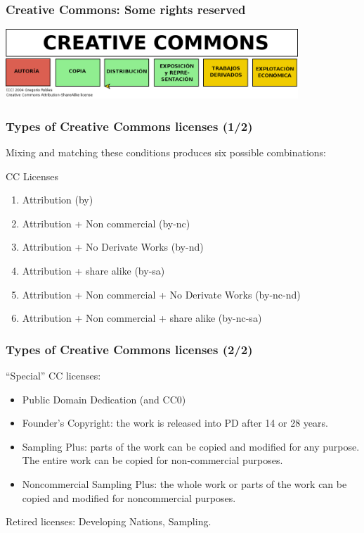 
\begin{frame}
\frametitle{Creative Commons: Some rights reserved}

\includegraphics[width=11cm]{figs/CreativeCommons.png}

\end{frame}


\begin{frame}
\frametitle{Types of Creative Commons licenses (1/2)}

Mixing and matching these conditions produces six possible combinations:

\begin{block}{CC Licenses}
\begin{enumerate}
\item Attribution (by)
\item Attribution + Non commercial (by-nc)
\item Attribution + No Derivate Works (by-nd)
\item Attribution + share alike (by-sa)
\item Attribution + Non commercial + No Derivate Works (by-nc-nd)
\item Attribution + Non commercial + share alike (by-nc-sa)
\end{enumerate}                                                 
\end{block}
\end{frame}


\begin{frame}
\frametitle{Types of Creative Commons licenses (2/2)}

``Special'' CC licenses:
\begin{itemize}
\item Public Domain Dedication (and CC0)
\item \alert{Founder's Copyright:} the work is released into PD after 14 or 28 years.
\item \alert{Sampling Plus:} parts of the work can be copied and modified for any purpose. The entire work can be copied for non-commercial purposes.
\item \alert{Noncommercial Sampling Plus:} the whole work or parts of the work can be copied and modified for noncommercial purposes. 
\end{itemize}                                                 

Retired licenses: Developing Nations, Sampling.

\end{frame}


